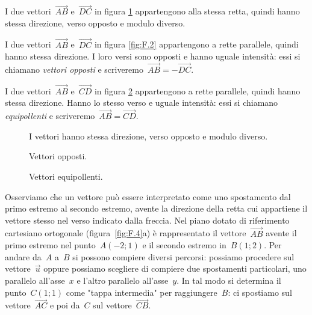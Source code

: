 \begin{exrig}
\begin{esempio}
I due vettori~$\overrightarrow{AB}$ e~$\overrightarrow{DC}$ in figura 
\ref{fig:F.1} appartengono alla stessa retta, quindi hanno stessa direzione, 
verso opposto e modulo diverso.
\end{esempio}

\begin{esempio}
I due vettori~$\overrightarrow{AB}$ e~$\overrightarrow{DC}$ in figura 
\ref{fig:F.2} appartengono a rette parallele, quindi hanno stessa direzione. I 
loro versi sono opposti e hanno
uguale intensità: essi si chiamano \emph{vettori opposti} e 
scriveremo~$\overrightarrow{AB}=-\overrightarrow{DC}$.
\end{esempio}

\begin{esempio}
I due vettori~$\overrightarrow{AB}$ e~$\overrightarrow{CD}$ in figura 
\ref{fig:F.3} appartengono a rette parallele, quindi hanno stessa direzione. 
Hanno lo stesso verso e uguale intensità:
essi si chiamano \emph{equipollenti} e 
scriveremo~$\overrightarrow{AB}=\overrightarrow{CD}$.
\end{esempio}
\end{exrig}

\begin{inaccessibleblock}
 \begin{figure}[b]
\centering

\caption{I vettori hanno stessa direzione, verso opposto e modulo 
diverso.}\label{fig:F.1}
\end{figure}
\end{inaccessibleblock}


 \begin{inaccessibleblock}
 \begin{figure}[t]
\begin{minipage}{0.45\textwidth}
\centering

\caption{Vettori opposti.}\label{fig:F.2}
\end{minipage}\hfil
\begin{minipage}{0.45\textwidth}
\centering

\caption{Vettori equipollenti.}\label{fig:F.3}
\end{minipage}
\end{figure}
\end{inaccessibleblock}

Osserviamo che un vettore può essere interpretato come uno spostamento dal 
primo estremo al secondo estremo, avente la direzione della retta cui appartiene 
il vettore stesso nel
verso indicato dalla freccia.
Nel piano dotato di riferimento cartesiano ortogonale (figura~\ref{fig:F.4}a) è 
rappresentato il vettore~$\overrightarrow{AB}$ avente il primo estremo nel 
punto~$A(-2;1)$ e
il secondo estremo
in~$B(1;2)$. Per andare da~$A$ a~$B$ si possono compiere diversi percorsi: 
possiamo procedere sul vettore~$\vec{u}$ oppure possiamo scegliere di compiere 
due spostamenti particolari,
uno parallelo all'asse~$x$ e l'altro parallelo all'asse~$y$. In tal modo si 
determina il punto~$C(1;1)$ come "tappa intermedia" per raggiungere~$B$:
ci spostiamo sul vettore~$\overrightarrow{AC}$ e poi da~$C$ sul 
vettore~$\overrightarrow{CB}$.

